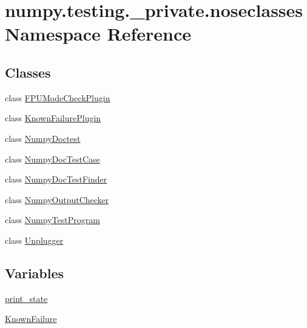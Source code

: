 \hypertarget{namespacenumpy_1_1testing_1_1__private_1_1noseclasses}{}\section{numpy.\+testing.\+\_\+private.\+noseclasses Namespace Reference}
\label{namespacenumpy_1_1testing_1_1__private_1_1noseclasses}
\subsection*{Classes}
\begin{DoxyCompactItemize}
\item 
class \hyperlink{classnumpy_1_1testing_1_1__private_1_1noseclasses_1_1FPUModeCheckPlugin}{F\+P\+U\+Mode\+Check\+Plugin}
\item 
class \hyperlink{classnumpy_1_1testing_1_1__private_1_1noseclasses_1_1KnownFailurePlugin}{Known\+Failure\+Plugin}
\item 
class \hyperlink{classnumpy_1_1testing_1_1__private_1_1noseclasses_1_1NumpyDoctest}{Numpy\+Doctest}
\item 
class \hyperlink{classnumpy_1_1testing_1_1__private_1_1noseclasses_1_1NumpyDocTestCase}{Numpy\+Doc\+Test\+Case}
\item 
class \hyperlink{classnumpy_1_1testing_1_1__private_1_1noseclasses_1_1NumpyDocTestFinder}{Numpy\+Doc\+Test\+Finder}
\item 
class \hyperlink{classnumpy_1_1testing_1_1__private_1_1noseclasses_1_1NumpyOutputChecker}{Numpy\+Output\+Checker}
\item 
class \hyperlink{classnumpy_1_1testing_1_1__private_1_1noseclasses_1_1NumpyTestProgram}{Numpy\+Test\+Program}
\item 
class \hyperlink{classnumpy_1_1testing_1_1__private_1_1noseclasses_1_1Unplugger}{Unplugger}
\end{DoxyCompactItemize}
\subsection*{Variables}
\begin{DoxyCompactItemize}
\item 
\hyperlink{namespacenumpy_1_1testing_1_1__private_1_1noseclasses_ab93cdbc12b8a667f1680dd1b06a9f697}{print\+\_\+state}
\item 
\hyperlink{namespacenumpy_1_1testing_1_1__private_1_1noseclasses_a75c2c60914f92aa5f52c7daee7cfc5b3}{Known\+Failure}
\end{DoxyCompactItemize}



